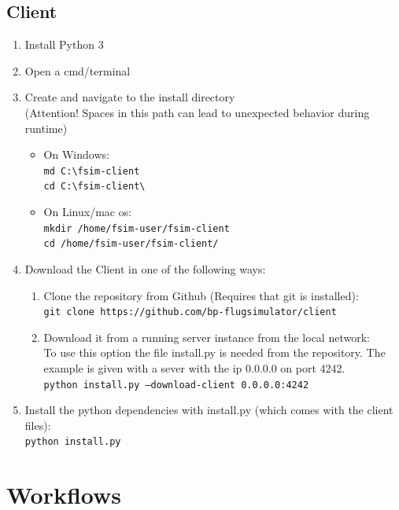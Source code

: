\documentclass[accentcolor=tud1a, paper=a4, colorback]{tudreport}
\begin{document}
	\section{Client}
	\begin{enumerate}
		\item Install Python 3
		\item Open a cmd/terminal
		\item Create and navigate to the install directory \\{\color{red}(Attention! Spaces in this path can lead to unexpected behavior during runtime)}
		\begin{itemize}
			\item On Windows: \\\texttt{md C:\textbackslash fsim-client \\ cd C:\textbackslash fsim-client\textbackslash}
			\item On Linux/mac os: \\\texttt{mkdir /home/fsim-user/fsim-client \\ cd /home/fsim-user/fsim-client/}
		\end{itemize}
		\item Download the Client in one of the following ways:
		\begin{enumerate}
			\item Clone the repository from Github (Requires that git is installed):\\\texttt{git clone https://github.com/bp-flugsimulator/client}
			\item Download it from a running server instance from the local network:\\ To use this option the file install.py is needed from the repository. The example is given with a sever with the ip 0.0.0.0 on port 4242.\\ \texttt{python install.py --download-client 0.0.0.0:4242}
		\end{enumerate}
		\item Install the python dependencies with install.py (which comes with the client files):\\ \texttt{python install.py}
	\end{enumerate}

	\chapter{Workflows}
\end{document}
